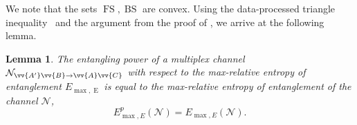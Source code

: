 \documentclass[aps,pra,twocolumn,superscriptaddress,longbibliography]{revtex4-1}
\def\FS{\operatorname{FS}}
\def\E{\operatorname{E}}
\def\BS{\operatorname{BS}}
\def\({\left(}
\def\){\right)}
\newcommand{\mc}[1]{\mathcal{#1}}
\newtheorem{lemma}{Lemma}
\begin{document}
We note that the sets $\FS,\BS$ are convex. Using the data-processed triangle inequality~\cite{CM17} and the argument from the proof of \cite[Proposition~2]{DBW17}, we arrive at the following lemma. 
\begin{lemma}\label{lem:max-amor}
The entangling power of a multiplex channel $\mc{N}_{\vv{A'}\vv{B}\to\vv{A}\vv{C}}$ with respect to the max-relative entropy of entanglement $E_{\max,\E}$ is equal to the max-relative entropy of entanglement of the channel $\mc{N}$,
\begin{equation}
E_{\max,E}^{p}(\mc{N})=E_{\max,E}(\mc{N}).\label{eq:max-amor}
\end{equation}
\end{lemma}

\end{document}
